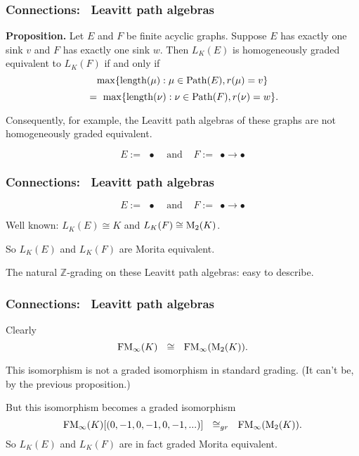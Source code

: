 \documentclass{beamer}
\begin{document}
\begin{frame}
\frametitle{Connections: \ Leavitt path algebras}


{\bf Proposition.}  
Let $E$ and $F$ be finite acyclic graphs.  Suppose $E$ has exactly one sink $v$ and $F$ has exactly one sink $w$.  Then $L_K(E)$ is homogeneously graded  equivalent to $L_K(F)$ if and only if 
$$\max\{ {\rm length}(\mu) : \mu \in {\rm Path}(E), r(\mu) = v \}$$  $$ \ = \ \max \{ {\rm length} ( \nu ) : \nu \in {\rm Path}(F), r(\nu) =  w \}.$$

\pause

\bigskip

Consequently, for example, the Leavitt path algebras of these graphs are not homogeneously graded equivalent.  

$$E:= \ \ \bullet \ \ \ \ \  \mbox{and} \ \ \ \ \ F:= \ \ \bullet \longrightarrow \bullet$$


\end{frame}


\begin{frame}
\frametitle{Connections: \ Leavitt path algebras}

$$E:= \ \ \bullet \ \ \ \ \  \mbox{and} \ \ \ \ \ F:= \ \ \bullet \longrightarrow \bullet$$

\bigskip

Well known:  $L_K(E)\cong K$ and $L_K(F) \cong {\rm M}_2(K)$.   

\bigskip

So $L_K(E)$ and $L_K(F)$ are Morita equivalent.  


\bigskip

 The natural $\mathbb{Z}$-grading on these Leavitt path algebras: easy to describe.  

\end{frame}


\begin{frame}
\frametitle{Connections: \ Leavitt path algebras}

   

\bigskip

Clearly $${\rm FM}_\infty(K) \ \  \cong \ \  {\rm FM}_\infty({\rm M}_2(K)).$$

   This isomorphism is not a graded isomorphism in standard grading.   (It can't be, by the previous proposition.)   

\bigskip

  But this isomorphism  becomes a graded isomorphism 
  $${\rm FM}_\infty(K)[(0,-1,0,-1,0,-1, ...)]   \ \ \cong_{gr}   \ \   {\rm FM}_\infty({\rm M}_2(K)).$$
  So $L_K(E)$ and $L_K(F)$ are in fact graded Morita equivalent.   

\end{frame}
\end{document}
